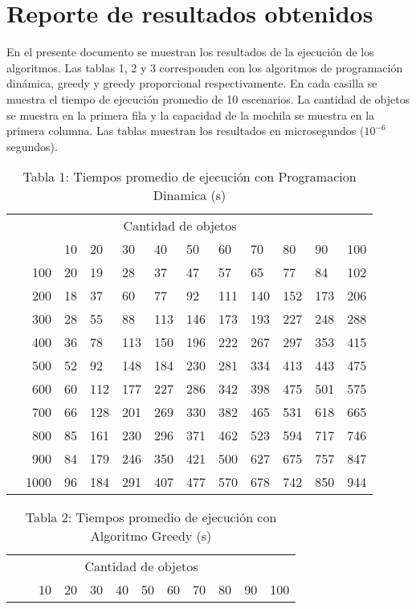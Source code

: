 \documentclass{article}
\begin{document}
\section*{Reporte de resultados obtenidos}
En el presente documento se muestran los resultados de la ejecución de los algoritmos. Las tablas 1, 2 y 3 corresponden con los algoritmos de programación dinámica, greedy y greedy proporcional respectivamente. En cada casilla se muestra el tiempo de ejecución promedio de 10 escenarios. La cantidad de objetos se muestra en la primera fila y la capacidad de la mochila se muestra en la primera columna. Las tablas muestran los resultados en microsegundos ($10^{-6}$ segundos).
\begin{center}
\begin{table}[ht]
\centering
\caption*{Tabla 1: Tiempos promedio de ejecución con Programacion Dinamica (\textmu s)}
\label{1}
\begin{tabularx}{0.8\textwidth}{Xr|XXXXXXXXXX}
&\multicolumn{10}{c}{Cantidad de objetos} \\
&&10&20&30&40&50&60&70&80&90&100\\\hline
\parbox[t]{2mm}{}&100&20&19&28&37&47&57&65&77&84&102\\
&200&18&37&60&77&92&111&140&152&173&206\\
&300&28&55&88&113&146&173&193&227&248&288\\
&400&36&78&113&150&196&222&267&297&353&415\\
&500&52&92&148&184&230&281&334&413&443&475\\
&600&60&112&177&227&286&342&398&475&501&575\\
&700&66&128&201&269&330&382&465&531&618&665\\
&800&85&161&230&296&371&462&523&594&717&746\\
&900&84&179&246&350&421&500&627&675&757&847\\
&1000&96&184&291&407&477&570&678&742&850&944\\
\end{tabularx}
\end{table}
\begin{table}[ht]
\centering
\caption*{Tabla 2: Tiempos promedio de ejecución con Algoritmo Greedy (\textmu s)}
\label{2}
\begin{tabularx}{0.8\textwidth}{Xr|XXXXXXXXXX}
&\multicolumn{10}{c}{Cantidad de objetos} \\
&&10&20&30&40&50&60&70&80&90&100\\\hline

\end{tabularx}
\end{table}
\end{center}
\end{document}
